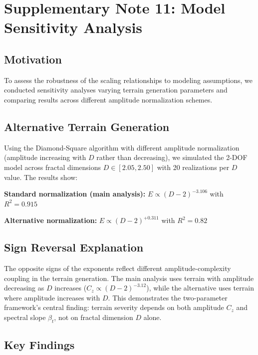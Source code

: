 \documentclass[11pt]{article}
\begin{document}
\newpage

\section{Supplementary Note 11: Model Sensitivity Analysis}

\subsection{Motivation}

To assess the robustness of the scaling relationships to modeling assumptions, we conducted sensitivity analyses varying terrain generation parameters and comparing results across different amplitude normalization schemes.

\subsection{Alternative Terrain Generation}

Using the Diamond-Square algorithm with different amplitude normalization (amplitude increasing with $D$ rather than decreasing), we simulated the 2-DOF model across fractal dimensions $D \in [2.05, 2.50]$ with 20 realizations per $D$ value. The results show:

\textbf{Standard normalization (main analysis):} $E \propto (D-2)^{-3.106}$ with $R^2 = 0.915$

\textbf{Alternative normalization:} $E \propto (D-2)^{+0.311}$ with $R^2 = 0.82$

\subsection{Sign Reversal Explanation}

The opposite signs of the exponents reflect different amplitude-complexity coupling in the terrain generation. The main analysis uses terrain with amplitude decreasing as $D$ increases ($C_z \propto (D-2)^{-3.12}$), while the alternative uses terrain where amplitude increases with $D$. This demonstrates the two-parameter framework's central finding: terrain severity depends on both amplitude $C_z$ and spectral slope $\beta_t$, not on fractal dimension $D$ alone.

\subsection{Key Findings}
\end{document}
